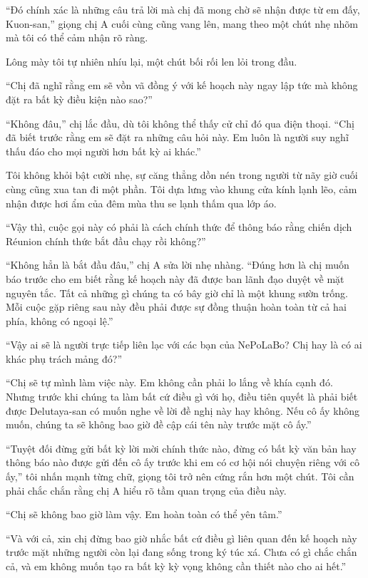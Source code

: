 \documentclass[../main.tex]{subfiles}
\begin{document}
``Đó chính xác là những câu trả lời mà chị đã mong chờ sẽ nhận được từ em đấy, Kuon-san,'' giọng chị A cuối cùng cũng vang lên, mang theo một chút nhẹ nhõm mà tôi có thể cảm nhận rõ ràng.

Lông mày tôi tự nhiên nhíu lại, một chút bối rối len lỏi trong đầu.

``Chị đã nghĩ rằng em sẽ vồn vã đồng ý với kế hoạch này ngay lập tức mà không đặt ra bất kỳ điều kiện nào sao?''

``Không đâu,'' chị lắc đầu, dù tôi không thể thấy cử chỉ đó qua điện thoại. ``Chị đã biết trước rằng em sẽ đặt ra những câu hỏi này. Em luôn là người suy nghĩ thấu đáo cho mọi người hơn bất kỳ ai khác.''

Tôi không khỏi bật cười nhẹ, sự căng thẳng dồn nén trong người từ nãy giờ cuối cùng cũng xua tan đi một phần. Tôi dựa lưng vào khung cửa kính lạnh lẽo, cảm nhận được hơi ẩm của đêm mùa thu se lạnh thấm qua lớp áo.

``Vậy thì, cuộc gọi này có phải là cách chính thức để thông báo rằng chiến dịch Réunion chính thức bắt đầu chạy rồi không?''

``Không hẳn là bắt đầu đâu,'' chị A sửa lời nhẹ nhàng. ``Đúng hơn là chị muốn báo trước cho em biết rằng kế hoạch này đã được ban lãnh đạo duyệt về mặt nguyên tắc. Tất cả những gì chúng ta có bây giờ chỉ là một khung sườn trống. Mỗi cuộc gặp riêng sau này đều phải được sự đồng thuận hoàn toàn từ cả hai phía, không có ngoại lệ.''

``Vậy ai sẽ là người trực tiếp liên lạc với các bạn của NePoLaBo? Chị hay là có ai khác phụ trách mảng đó?''

``Chị sẽ tự mình làm việc này. Em không cần phải lo lắng về khía cạnh đó. Nhưng trước khi chúng ta làm bất cứ điều gì với họ, điều tiên quyết là phải biết được Delutaya-san có muốn nghe về lời đề nghị này hay không. Nếu cô ấy không muốn, chúng ta sẽ không bao giờ đề cập cái tên này trước mặt cô ấy.''

``Tuyệt đối đừng gửi bất kỳ lời mời chính thức nào, đừng có bất kỳ văn bản hay thông báo nào được gửi đến cô ấy trước khi em có cơ hội nói chuyện riêng với cô ấy,'' tôi nhấn mạnh từng chữ, giọng tôi trở nên cứng rắn hơn một chút. Tôi cần phải chắc chắn rằng chị A hiểu rõ tầm quan trọng của điều này.

``Chị sẽ không bao giờ làm vậy. Em hoàn toàn có thể yên tâm.''

``Và với cả, xin chị đừng bao giờ nhắc bất cứ điều gì liên quan đến kế hoạch này trước mặt những người còn lại đang sống trong ký túc xá. Chưa có gì chắc chắn cả, và em không muốn tạo ra bất kỳ kỳ vọng không cần thiết nào cho ai hết.''
\end{document}
